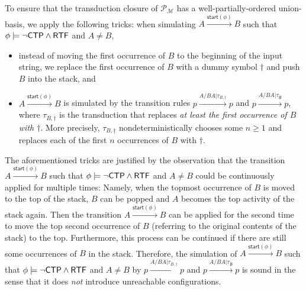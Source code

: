 \documentclass[preprint,12pt]{elsarticle}
\newcommand\Mm{{\mathcal{M} }}
\newcommand\Pp{{\mathcal{P} }}
\newcommand\ctpflag{{\sf CTP}}
\newcommand\rtfflag{{\sf RTF}}
\newcommand\startactivity{{\mathsf{start} }}
\newcommand\Aut{{\mathfrak{A} }}
\newcommand\TranSet{{\mathscr{T} }}
\newcommand{\WOTrPDS}{\textsf{WPOTrPDS}}
\newcommand{\tl}[1]{\color{magenta} {TL: #1 :LT} \color{black}}
\newcommand{\tl}[1]{}
\begin{document}
To ensure that the transduction closure of $\Pp_\Mm$  has a well-partially-ordered union-basis, we
apply the following tricks: when simulating $A \xrightarrow{\startactivity(\phi)}B$ such that $\phi \models \neg \ctpflag \wedge \rtfflag$ and $A \neq B$,
\begin{itemize}
\item instead of moving the first occurrence of $B$ to the beginning of the input string, we replace the first occurrence of $B$ with a dummy symbol $\dag$ and push $B$ into the stack, and
%
\item $A \xrightarrow{\startactivity(\phi)}B$ is simulated by the transition rules $p \xrightarrow{A / BA | \tau_{B, \dag}} p$ and  $p \xrightarrow{A / BA | \tau_{\not B}} p$, where $\tau_{B, \dag}$ is the transduction that replaces \emph{at least the first occurrence of $B$ with $\dag$}. More precisely, $\tau_{B, \dag}$ nondeterministically chooses some $n \ge 1$ and replaces each of the first $n$ occurrences of $B$ with $\dag$.
\end{itemize}
The aforementioned tricks are justified by the observation that the transition $A \xrightarrow{\startactivity(\phi)}B$ such that $\phi \models \neg \ctpflag \wedge \rtfflag$ and $A \neq B$ could be continuously applied for multiple times: Namely, when the topmost occurrence of $B$ is moved to the top of the stack, $B$ can be popped and $A$ becomes the top activity of the stack again. Then the transition $A \xrightarrow{\startactivity(\phi)}B$ can be applied for the second time to move the top second occurrence of $B$  (referring to the original contents of the stack) to the top. Furthermore, this process can be continued if there are still some occurrences of $B$ in the stack. Therefore, the simulation of $A \xrightarrow{\startactivity(\phi)}B$ such that $\phi \models \neg \ctpflag \wedge \rtfflag$ and $A \neq B$ by $p \xrightarrow{A / BA | \tau_{B, \dag}} p$ and  $p \xrightarrow{A / BA | \tau_{\not B}} p$ is sound in the sense that it does \emph{not} introduce unreachable configurations.

\end{document}
